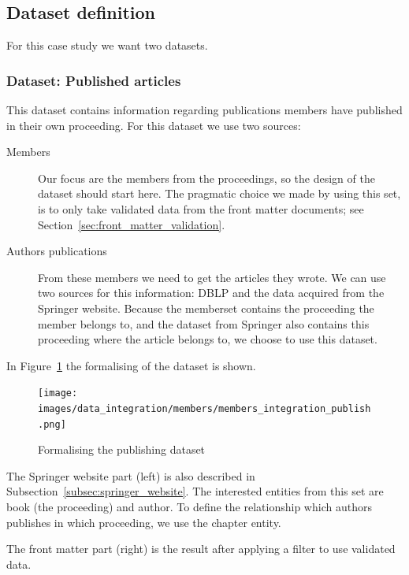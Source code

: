 \documentclass{ou-report}
\newcommand{\dblp}{DBLP}
\begin{document}
\subsection{Dataset definition}
For this case study we want two datasets.

\subsubsection{Dataset: Published articles}
\label{subsubsec:dataset_published_articles}
This dataset contains information regarding publications members have published 
in their own proceeding. For this dataset we use two sources:
\begin{description}
    \item[Members] Our focus are the members from the proceedings, so the design of the dataset
    should start here. The pragmatic choice we made by using this set, is to only
    take validated data from the front matter documents; see 
    Section~\ref{sec:front_matter_validation}.
    \item[Authors publications] From these members we need to get the articles they wrote. We can use two sources
    for this information: \dblp{} and the data acquired from the Springer website.
    Because the memberset contains the proceeding the member belongs to, and the
    dataset from Springer also contains this proceeding where the article belongs to, 
    we choose to use this dataset.
\end{description}

In Figure~\ref{fig:members_integration_publish} the formalising of the dataset
is shown.

\begin{figure}[H]
    \centering
    \texttt{[image: images/data\_integration/members/members\_integration\_publish.png]}
    \caption{Formalising the publishing dataset}
    \label{fig:members_integration_publish}
\end{figure}

The Springer website part (left) is also described in 
Subsection~\ref{subsec:springer_website}. The interested entities from this set
are book (the proceeding) and author. To define the relationship which authors 
publishes in which proceeding, we use the chapter entity.

The front matter part (right) is the result after applying a filter to use 
validated data. 
\end{document}
